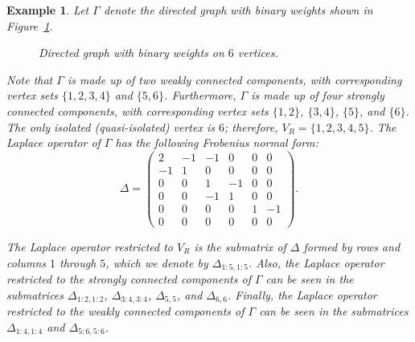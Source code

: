 \documentclass{article}
\newtheorem{example}[theorem]{Example}
\begin{document}
\begin{example}\label{ex1}
Let $\Gamma$ denote the directed graph with binary weights shown in Figure~\ref{fig1}.
\begin{figure}[h]
\centering
{}
\caption{Directed graph with binary weights on $6$ vertices.}
\label{fig1}
\end{figure}
Note that $\Gamma$ is made up of two weakly connected components, with corresponding vertex sets $\{1,2,3,4\}$ and $\{5,6\}$.
Furthermore, $\Gamma$ is made up of four strongly connected components, with corresponding vertex sets $\{1,2\}$, $\{3,4\}$, $\{5\}$, and $\{6\}$.
The only isolated (quasi-isolated) vertex is $6$; therefore, $V_{R}=\{1,2,3,4,5\}$. 
The Laplace operator of $\Gamma$ has the following Frobenius normal form:
\[
\Delta = \left(\begin{array}{cccccc}
		2 & -1 & -1 & 0 & 0 & 0 \\
		-1 & 1 & 0 & 0 & 0 & 0 \\
		0 & 0 & 1 & -1 & 0 & 0 \\
		0 & 0 & -1 & 1 & 0 & 0 \\
		0 & 0 & 0 & 0 & 1 & -1 \\
		0 & 0 & 0 & 0 & 0 & 0
		\end{array}\right).
\]

The Laplace operator restricted to $V_{R}$ is the submatrix of $\Delta$ formed by rows and columns $1$ through $5$, which we denote by $\Delta_{1:5,1:5}$. 
Also, the Laplace operator restricted to the strongly connected components of $\Gamma$ can be seen in the submatrices $\Delta_{1:2,1:2}$, $\Delta_{3:4,3:4}$, $\Delta_{5,5}$, and $\Delta_{6,6}$.
Finally, the Laplace operator restricted to the weakly connected components of $\Gamma$ can be seen in the submatrices $\Delta_{1:4,1:4}$ and $\Delta_{5:6,5:6}$.


\end{example}
\end{document}
